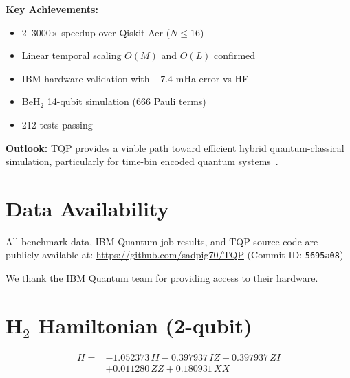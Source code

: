\documentclass[aps,prx,twocolumn,superscriptaddress,floatfix]{revtex4-2}
\begin{document}
\textbf{Key Achievements:}
\begin{itemize}
    \item 2--3000$\times$ speedup over Qiskit Aer ($N \le 16$)
    \item Linear temporal scaling $O(M)$ and $O(L)$ confirmed
    \item IBM hardware validation with $-7.4$ mHa error vs HF
    \item BeH$_2$ 14-qubit simulation (666 Pauli terms)
    \item 212 tests passing
\end{itemize}

\textbf{Outlook:} TQP provides a viable path toward efficient hybrid quantum-classical simulation, particularly for time-bin encoded quantum systems~\cite{brecht2015photon,lukens2017frequency}.

\section*{Data Availability}

All benchmark data, IBM Quantum job results, and TQP source code are publicly available at:
\url{https://github.com/sadpig70/TQP} (Commit ID: \texttt{5695a08})

\begin{acknowledgments}
We thank the IBM Quantum team for providing access to their hardware.
\end{acknowledgments}

\appendix

\section{H$_2$ Hamiltonian (2-qubit)}
\label{sec:sm_h2}

\begin{equation}
\begin{split}
H = {} & -1.052373\, II - 0.397937\, IZ - 0.397937\, ZI \\
       & + 0.011280\, ZZ + 0.180931\, XX
\end{split}
\end{equation}
\end{document}
